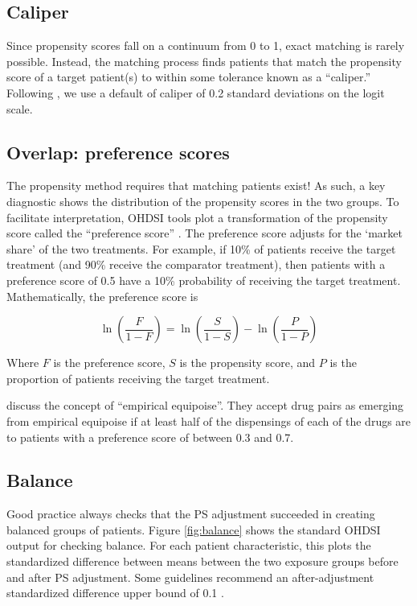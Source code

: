 \documentclass[11pt]{book}
\begin{document}
\subsection{Caliper}\label{caliper}

Since propensity scores fall on a continuum from 0 to 1, exact matching
is rarely possible. Instead, the matching process finds patients that
match the propensity score of a target patient(s) to within some
tolerance known as a ``caliper.'' Following \citet{austin_2011}, we use
a default of caliper of 0.2 standard deviations on the logit scale.

\subsection{Overlap: preference scores}\label{overlap-preference-scores}

The propensity method requires that matching patients exist! As such, a
key diagnostic shows the distribution of the propensity scores in the
two groups. To facilitate interpretation, OHDSI tools plot a
transformation of the propensity score called the ``preference score''
\citep{walker_2013}. The preference score adjusts for the `market share'
of the two treatments. For example, if 10\% of patients receive the
target treatment (and 90\% receive the comparator treatment), then
patients with a preference score of 0.5 have a 10\% probability of
receiving the target treatment. Mathematically, the preference score is

\[\ln\left(\frac{F}{1-F}\right)=\ln\left(\frac{S}{1-S}\right)-\ln\left(\frac{P}{1-P}\right)\]

Where \(F\) is the preference score, \(S\) is the propensity score, and
\(P\) is the proportion of patients receiving the target treatment.

\citet{walker_2013} discuss the concept of ``empirical equipoise''. They
accept drug pairs as emerging from empirical equipoise if at least half
of the dispensings of each of the drugs are to patients with a
preference score of between 0.3 and 0.7.

\subsection{Balance}\label{balance}

Good practice always checks that the PS adjustment succeeded in creating
balanced groups of patients. Figure \ref{fig:balance} shows the standard
OHDSI output for checking balance. For each patient characteristic, this
plots the standardized difference between means between the two exposure
groups before and after PS adjustment. Some guidelines recommend an
after-adjustment standardized difference upper bound of 0.1
\citep{rubin_2001}.
\end{document}
